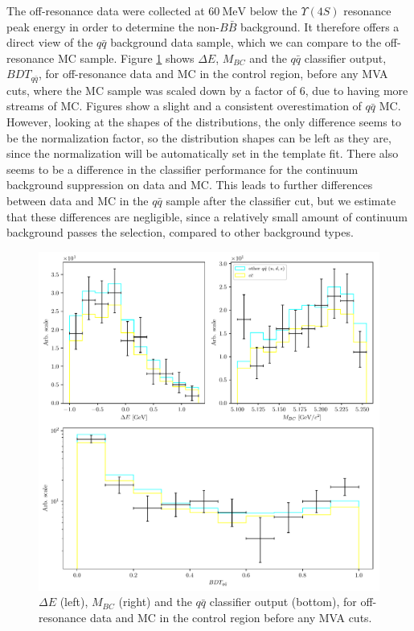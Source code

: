 \documentclass[  headings=standardclasses,
  headings=big,oneside,a4paper,openany,12pt]{scrbook}
\newcommand {\e}[1]{\mathrm{~#1}}
\begin{document}
The off-resonance data were collected at $60\e{MeV}$ below the $\Upsilon(4S)$ resonance peak energy in order to determine the non-$B\bar B$ background. It therefore offers a direct view of the $q\bar q$ background data sample, which we can compare to the off-resonance MC sample. Figure \ref{fig:offres_control} shows $\Delta E$, $M_{BC}$ and the $q \bar q$ classifier output, $BDT_{q\bar q}$, for off-resonance data and MC in the control region, before any MVA cuts, where the MC sample was scaled down by a factor of $6$, due to having more streams of MC. Figures show a slight and a consistent overestimation of $q\bar q$ MC. However, looking at the shapes of the distributions, the only difference seems to be the normalization factor, so the distribution shapes can be left as they are, since the normalization will be automatically set in the template fit. There also seems to be a difference in the classifier performance for the continuum background suppression on data and MC. This leads to further differences between data and MC in the $q \bar q$ sample after the classifier cut, but we estimate that these differences are negligible, since a relatively small amount of continuum background passes the selection, compared to other background types.

\begin{figure}[H]
\centering
\captionsetup{width=0.8\linewidth}
\includegraphics[width=\linewidth]{fig/offres_control}
\caption{$\Delta E$ (left), $M_{BC}$ (right) and the $q \bar q$ classifier output (bottom), for off-resonance data and MC in the control region before any MVA cuts.}
\label{fig:offres_control}
\end{figure}
\end{document}
